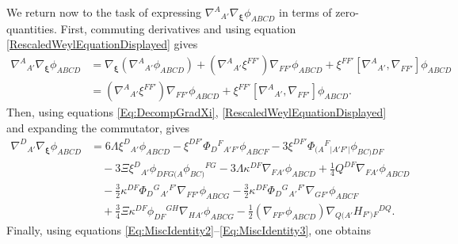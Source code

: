 \documentclass[10pt,a4paper]{article}
\theoremstyle{plain}
\begin{document}
We return now to the task of expressing $
\nabla^A{}_{A'}\nabla_{\bm\xi}\phi_{ABCD}$ in terms of
zero-quantities. First, commuting derivatives and using equation
\eqref{RescaledWeylEquationDisplayed} gives
\begin{align}
    \nabla^A{}_{A'}\nabla_{\bm\xi}\phi_{ABCD} &=
    \nabla_{\bm\xi}(\nabla^A{}_{A'}\phi_{ABCD}) +
    (\nabla^A{}_{A'}\xi^{FF'})\nabla_{FF'} \phi_{ABCD} +
    \xi^{FF'}\left[\nabla^A{}_{A'},
      \nabla_{FF'}\right]\phi_{ABCD}\nonumber\\ & =
    (\nabla^A{}_{A'}\xi^{FF'})\nabla_{FF'} \phi_{ABCD} +
    \xi^{FF'}\left[\nabla^A{}_{A'}, \nabla_{FF'}\right]\phi_{ABCD}.
\end{align}
Then, using equations \eqref{Eq:DecompGradXi},
\eqref{RescaledWeylEquationDisplayed}
and expanding the commutator, gives
\begin{align*}
\nabla^D{}_{A'}\nabla_{\bm\xi}\phi_{ABCD} & = 6 \Lambda \xi^{D}{}_{A'} \phi_{ABCD} -  \xi^{DF'} \Phi_{D}{}^{F}{}_{A'F'} \phi_{ABCF} -  3\xi^{DF'} \Phi_{(A}{}^{F}{}_{\vert A'F'\vert} \phi_{BC)DF}  \nonumber\\
    &\quad -  3\Xi\xi^{D}{}_{A'}  \phi_{DFG(A} \phi_{BC)}{}^{FG} - 3\Lambda \kappa^{DF} \nabla_{FA'}\phi_{ABCD} + \tfrac{1}{4} Q^{DF} \nabla_{FA'}\phi_{ABCD}  \nonumber\\ 
    &\quad -  \tfrac{3}{2} \kappa^{DF} \Phi_{D}{}^{G}{}_{A'}{}^{F'} \nabla_{FF'}\phi_{ABCG} -  \tfrac{3}{2} \kappa^{DF} \Phi_{D}{}^{G}{}_{A'}{}^{F'} \nabla_{GF'}\phi_{ABCF} \nonumber\\
    &\quad + \tfrac{3}{4} \Xi \kappa^{DF} \phi_{DF}{}^{GH} \nabla_{HA'}\phi_{ABCG} - \tfrac{1}{2}( \nabla_{FF'}\phi_{ABCD}) \nabla_{Q(A'}H_{F')F}{}^{DQ}.
\end{align*}
Finally, using equations \eqref{Eq:MiscIdentity2}--\eqref{Eq:MiscIdentity3}, one obtains
\end{document}
